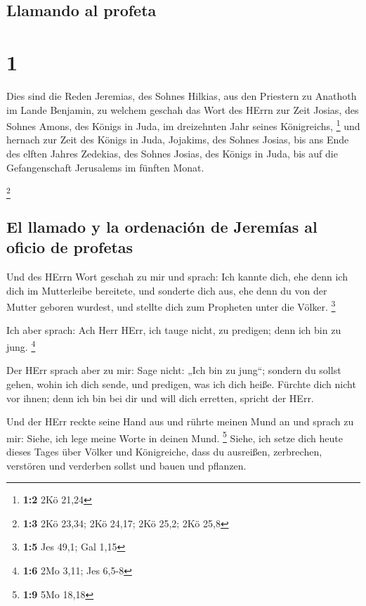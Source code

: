 \hypertarget{llamando-al-profeta}{%
\subsection{Llamando al profeta}\label{llamando-al-profeta}}

\hypertarget{section}{%
\section{1}\label{section}}

 Dies sind die Reden Jeremias, des Sohnes Hilkias, aus den
Priestern zu Anathoth im Lande Benjamin,  zu welchem
geschah das Wort des HErrn zur Zeit Josias, des Sohnes Amons, des Königs
in Juda, im dreizehnten Jahr seines Königreichs, \footnote{\textbf{1:2}
  2Kö 21,24}  und hernach zur Zeit des Königs in Juda,
Jojakims, des Sohnes Josias, bis ans Ende des elften Jahres Zedekias,
des Sohnes Josias, des Königs in Juda, bis auf die Gefangenschaft
Jerusalems im fünften Monat.

\footnote{\textbf{1:3} 2Kö 23,34; 2Kö 24,17; 2Kö 25,2; 2Kö 25,8}

\hypertarget{el-llamado-y-la-ordenaciuxf3n-de-jeremuxedas-al-oficio-de-profetas}{%
\subsection{El llamado y la ordenación de Jeremías al oficio de
profetas}\label{el-llamado-y-la-ordenaciuxf3n-de-jeremuxedas-al-oficio-de-profetas}}

 Und des HErrn Wort geschah zu mir und sprach:
 Ich kannte dich, ehe denn ich dich im Mutterleibe
bereitete, und sonderte dich aus, ehe denn du von der Mutter geboren
wurdest, und stellte dich zum Propheten unter die Völker. \footnote{\textbf{1:5}
  Jes 49,1; Gal 1,15}

 Ich aber sprach: Ach Herr HErr, ich tauge nicht, zu
predigen; denn ich bin zu jung. \footnote{\textbf{1:6} 2Mo 3,11; Jes
  6,5-8}

 Der HErr sprach aber zu mir: Sage nicht: „Ich bin zu
jung``; sondern du sollst gehen, wohin ich dich sende, und predigen, was
ich dich heiße.  Fürchte dich nicht vor ihnen; denn ich
bin bei dir und will dich erretten, spricht der HErr.

 Und der HErr reckte seine Hand aus und rührte meinen Mund
an und sprach zu mir: Siehe, ich lege meine Worte in deinen Mund.
\footnote{\textbf{1:9} 5Mo 18,18}  Siehe, ich setze dich
heute dieses Tages über Völker und Königreiche, dass du ausreißen,
zerbrechen, verstören und verderben sollst und bauen und pflanzen.

